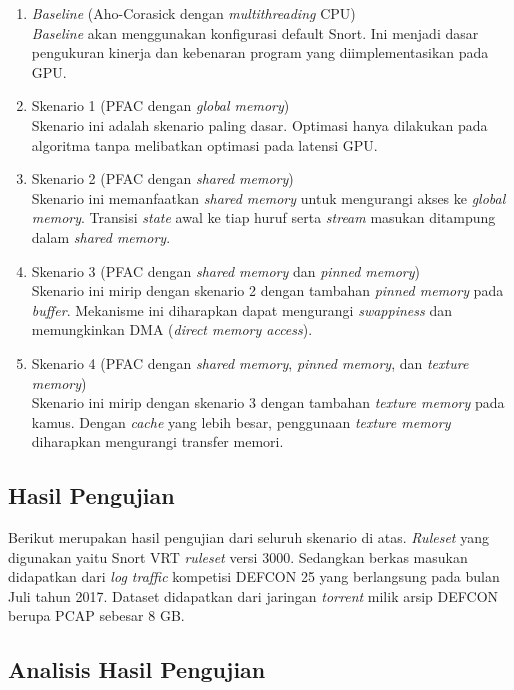     \begin{enumerate}
      
      \item \emph{Baseline} (Aho-Corasick dengan \emph{multithreading} CPU) \\
      \emph{Baseline} akan menggunakan konfigurasi default Snort. Ini menjadi dasar pengukuran kinerja dan kebenaran program yang diimplementasikan pada GPU.

      \item Skenario 1 (PFAC dengan \emph{global memory}) \\
      Skenario ini adalah skenario paling dasar. Optimasi hanya dilakukan pada algoritma tanpa melibatkan optimasi pada latensi GPU.

      \item Skenario 2 (PFAC dengan \emph{shared memory}) \\
      Skenario ini memanfaatkan \emph{shared memory} untuk mengurangi akses ke \emph{global memory}. Transisi \emph{state} awal ke tiap huruf serta \emph{stream} masukan ditampung dalam \emph{shared memory}.

      \item Skenario 3 (PFAC dengan \emph{shared memory} dan \emph{pinned memory}) \\
      Skenario ini mirip dengan skenario 2 dengan tambahan \emph{pinned memory} pada \emph{buffer}. Mekanisme ini diharapkan dapat mengurangi \emph{swappiness} dan memungkinkan DMA (\emph{direct memory access}).

      \item Skenario 4 (PFAC dengan \emph{shared memory}, \emph{pinned memory}, dan \emph{texture memory}) \\
      Skenario ini mirip dengan skenario 3 dengan tambahan \emph{texture memory} pada kamus. Dengan \emph{cache} yang lebih besar, penggunaan \emph{texture memory} diharapkan mengurangi transfer memori.

    \end{enumerate}

  \subsection{Hasil Pengujian}

    Berikut merupakan hasil pengujian dari seluruh skenario di atas. \emph{Ruleset} yang digunakan yaitu Snort VRT \emph{ruleset} versi 3000. Sedangkan berkas masukan didapatkan dari \emph{log traffic} kompetisi DEFCON 25 yang berlangsung pada bulan Juli tahun 2017. Dataset didapatkan dari jaringan \emph{torrent} milik arsip DEFCON berupa PCAP sebesar 8 GB.

    

  \subsection{Analisis Hasil Pengujian}
